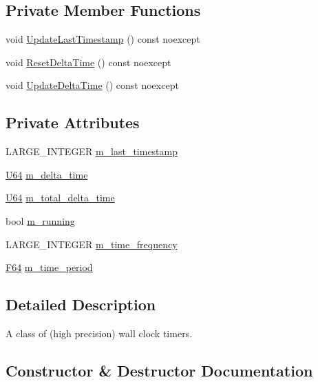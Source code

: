 \subsection*{Private Member Functions}
\begin{DoxyCompactItemize}
\item 
void \hyperlink{classmage_1_1_timer_ad0ff38a28efd65e7c147c8c399245d06}{Update\+Last\+Timestamp} () const noexcept
\item 
void \hyperlink{classmage_1_1_timer_a5b66b3bfbed7cd4a3ad565abec5c3b02}{Reset\+Delta\+Time} () const noexcept
\item 
void \hyperlink{classmage_1_1_timer_a10f12ad8645e8022a09067f1393c065b}{Update\+Delta\+Time} () const noexcept
\end{DoxyCompactItemize}
\subsection*{Private Attributes}
\begin{DoxyCompactItemize}
\item 
L\+A\+R\+G\+E\+\_\+\+I\+N\+T\+E\+G\+ER \hyperlink{classmage_1_1_timer_a6effbc37827492397cc781a78165a08a}{m\+\_\+last\+\_\+timestamp}
\item 
\hyperlink{namespacemage_a6672cf3c861707ce4a3235a3eb43941d}{U64} \hyperlink{classmage_1_1_timer_a2a6fcda6238524401de58b4462121286}{m\+\_\+delta\+\_\+time}
\item 
\hyperlink{namespacemage_a6672cf3c861707ce4a3235a3eb43941d}{U64} \hyperlink{classmage_1_1_timer_a597eae6b756d0f50bcb1541db0f1c7f0}{m\+\_\+total\+\_\+delta\+\_\+time}
\item 
bool \hyperlink{classmage_1_1_timer_ac8d975843e5b2199848284de910d3291}{m\+\_\+running}
\item 
L\+A\+R\+G\+E\+\_\+\+I\+N\+T\+E\+G\+ER \hyperlink{classmage_1_1_timer_a64e9afd31a95058e1736e84122c663d3}{m\+\_\+time\+\_\+frequency}
\item 
\hyperlink{namespacemage_ad26233bbec640deda836e572c1a23708}{F64} \hyperlink{classmage_1_1_timer_a666e06f94a9c5875ab6cbce8d2750a11}{m\+\_\+time\+\_\+period}
\end{DoxyCompactItemize}


\subsection{Detailed Description}
A class of (high precision) wall clock timers. 

\subsection{Constructor \& Destructor Documentation}
\hypertarget{classmage_1_1_timer_ad529d2329ae911c8b4c64efd05a71dd0}{}\label{classmage_1_1_timer_ad529d2329ae911c8b4c64efd05a71dd0} 
